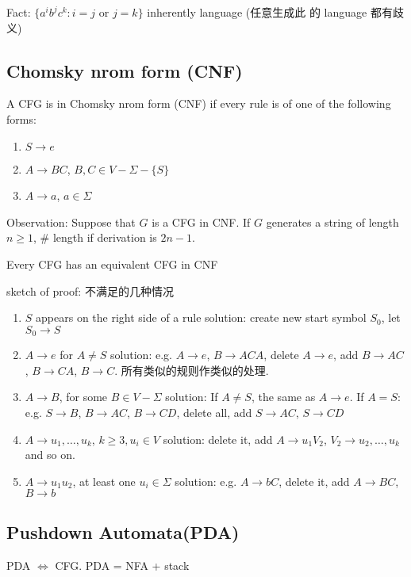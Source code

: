 Fact: $\{ a^ib^jc^k:i=j \text{ or }j=k \}$ inherently language (任意生成此 的 language 都有歧义) 

\subsection{Chomsky nrom form (CNF)}

\begin{definition}
    A CFG is in Chomsky nrom form (CNF) if every rule is of one of the following forms:
    \begin{enumerate}
        \item $S\to e$
        \item $A\to BC$, $B,C\in V-\Sigma-\{S\}$
        \item $A\to a$, $a\in \Sigma$
    \end{enumerate}
\end{definition}

Observation: Suppose that $G$ is a CFG in CNF. If $G$ generates a string of length $n\ge 1$, \# length if derivation is $2n-1$. 

\begin{theorem}
    Every CFG has an equivalent CFG in CNF
\end{theorem}
sketch of proof: 不满足的几种情况
\begin{enumerate}
    \item $S$ appears on the right side of a rule
    \subitem solution: create new start symbol $S_0$, let $S_0\to S$
    \item $A\to e$ for $A\ne S$
    \subitem solution: e.g. $A\to e$, $B\to ACA$, delete $A\to e$, add $B\to AC$, $B\to CA$, $B\to C$. 所有类似的规则作类似的处理. 
    \item $A\to B$, for some $B\in V-\Sigma$
    \subitem solution: If $A\ne S$, the same as $A\to e$. If $A=S$: e.g. $S\to B$, $B\to AC$, $B\to CD$, delete all, add $S\to AC$, $S\to CD$
    \item $A\to u_1,\dots,u_k$, $k\ge 3, u_i \in V$
    \subitem solution: delete it, add $A\to u_1V_2$, $V_2\to u_2,\dots,u_k$ and so on. 
    \item $A\to u_1 u_2$, at least one $u_i \in \Sigma$
    \subitem solution: e.g. $A\to bC$, delete it, add $A\to BC$, $B\to b$
\end{enumerate}

\subsection{Pushdown Automata(PDA)}
PDA $\iff$ CFG. PDA = NFA + stack

